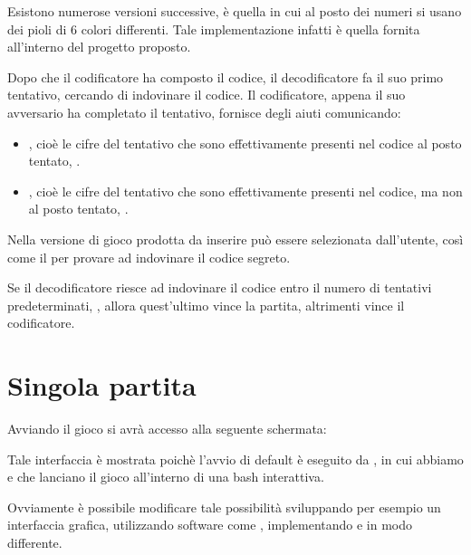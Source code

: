 \documentclass[letterpaper,10pt,italian,openany,oneside]{sphinxmanual}
\begin{document}
Esistono numerose versioni successive,  è quella in cui al posto dei numeri si usano dei pioli di 6 colori differenti. Tale implementazione infatti è quella fornita all’interno del progetto proposto.

Dopo che il codificatore ha composto il codice, il decodificatore fa il suo primo tentativo, cercando di indovinare il codice. Il codificatore, appena il suo avversario ha completato il tentativo, fornisce degli aiuti comunicando:
\begin{itemize}
\item {} 
, cioè le cifre del tentativo che sono effettivamente presenti nel codice al posto tentato, .

\item {} 
, cioè le cifre del tentativo che sono effettivamente presenti nel codice, ma non al posto tentato, .

\end{itemize}

Nella versione di gioco prodotta  da inserire può essere selezionata dall’utente, così come il  per provare ad indovinare il codice segreto.

Se il decodificatore riesce ad indovinare il codice entro il numero di tentativi predeterminati, , allora quest’ultimo vince la partita, altrimenti vince il codificatore.


\section{Singola partita}
\label{\detokenize{gameguide:singola-partita}}
Avviando il gioco si avrà accesso alla seguente schermata:

\noindent{}

Tale interfaccia è mostrata poichè l’avvio di default è eseguito da , in cui abbiamo  e  che lanciano il gioco all’interno di una bash interattiva.

Ovviamente è possibile modificare tale possibilità sviluppando per esempio un interfaccia grafica, utilizzando software come , implementando  e  in modo differente.
\end{document}
